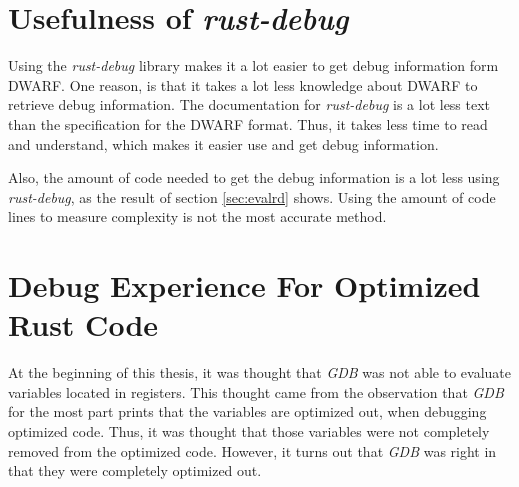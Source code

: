 


\section{Usefulness of \emph{rust-debug}} %
Using the \emph{rust-debug} library makes it a lot easier to get debug information form \gls{DWARF}.
One reason, is that it takes a lot less knowledge about \gls{DWARF} to retrieve debug information.
The documentation for \emph{rust-debug} is a lot less text than the specification for the \gls{DWARF} format.
Thus, it takes less time to read and understand, which makes it easier use and get debug information.


Also, the amount of code needed to get the debug information is a lot less using \emph{rust-debug}, as the result of section \ref{sec:evalrd} shows.
Using the amount of code lines to measure complexity is not the most accurate method.





\section{Debug Experience For Optimized Rust Code} %
At the beginning of this thesis, it was thought that \emph{GDB} was not able to evaluate variables located in registers.
This thought came from the observation that \emph{GDB} for the most part prints that the variables are optimized out, when debugging optimized code.
Thus, it was thought that those variables were not completely removed from the optimized code.
However, it turns out that \emph{GDB} was right in that they were completely optimized out.


